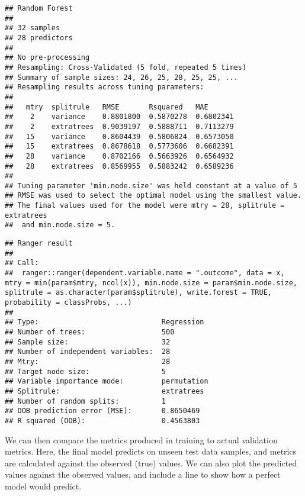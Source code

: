 \documentclass[
  oneside]{book}
\newenvironment{Shaded}{\begin{snugshade}}{\end{snugshade}}
\newcommand{\FunctionTok}[1]{\textcolor[rgb]{0.00,0.00,0.00}{#1}}
\newcommand{\NormalTok}[1]{#1}
\newcommand{\SpecialCharTok}[1]{\textcolor[rgb]{0.00,0.00,0.00}{#1}}
\begin{document}
\begin{verbatim}
## Random Forest 
## 
## 32 samples
## 28 predictors
## 
## No pre-processing
## Resampling: Cross-Validated (5 fold, repeated 5 times) 
## Summary of sample sizes: 24, 26, 25, 28, 25, 25, ... 
## Resampling results across tuning parameters:
## 
##   mtry  splitrule   RMSE       Rsquared   MAE      
##    2    variance    0.8801800  0.5870278  0.6802341
##    2    extratrees  0.9039197  0.5888711  0.7113279
##   15    variance    0.8604439  0.5806824  0.6573050
##   15    extratrees  0.8678618  0.5773606  0.6682391
##   28    variance    0.8702166  0.5663926  0.6564932
##   28    extratrees  0.8569955  0.5883242  0.6589236
## 
## Tuning parameter 'min.node.size' was held constant at a value of 5
## RMSE was used to select the optimal model using the smallest value.
## The final values used for the model were mtry = 28, splitrule = extratrees
##  and min.node.size = 5.
\end{verbatim}

\begin{Shaded}
\end{Shaded}

\begin{verbatim}
## Ranger result
## 
## Call:
##  ranger::ranger(dependent.variable.name = ".outcome", data = x,      mtry = min(param$mtry, ncol(x)), min.node.size = param$min.node.size,      splitrule = as.character(param$splitrule), write.forest = TRUE,      probability = classProbs, ...) 
## 
## Type:                             Regression 
## Number of trees:                  500 
## Sample size:                      32 
## Number of independent variables:  28 
## Mtry:                             28 
## Target node size:                 5 
## Variable importance mode:         permutation 
## Splitrule:                        extratrees 
## Number of random splits:          1 
## OOB prediction error (MSE):       0.8650469 
## R squared (OOB):                  0.4563803
\end{verbatim}

We can then compare the metrics produced in training to actual validation metrics. Here,
the final model predicts on unseen test data samples, and metrics are calculated
against the observed (true) values. We can also plot the predicted values against the
observed values, and include a line to show how a perfect model would predict.
\end{document}
